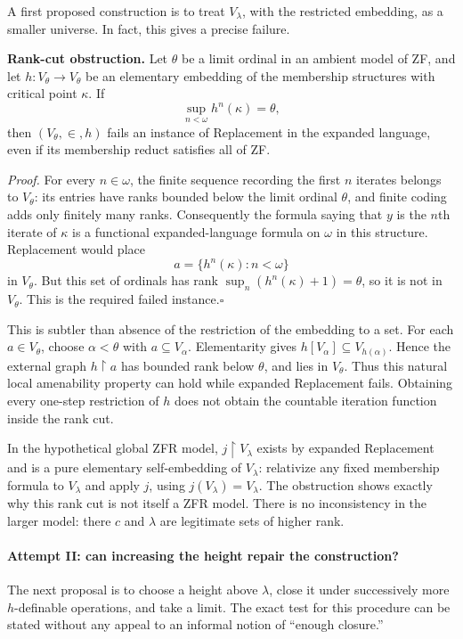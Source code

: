 \documentclass[11pt]{article}
\begin{document}
A first proposed construction is to treat $V_\lambda$, with the restricted
embedding, as a smaller universe.  In fact, this gives a precise failure.

\textbf{Rank-cut obstruction.}
Let $\theta$ be a limit ordinal in an ambient model of ZF, and let
$h:V_\theta\to V_\theta$ be an elementary embedding of the membership
structures with critical point $\kappa$.  If
\[
 \sup_{n<\omega}h^n(\kappa)=\theta,
\]
then $(V_\theta,\in,h)$ fails an instance of Replacement in the expanded
language, even if its membership reduct satisfies all of ZF.

\emph{Proof.}
For every $n\in\omega$, the finite sequence recording the first $n$ iterates
belongs to $V_\theta$: its entries have ranks bounded below the limit ordinal
$\theta$, and finite coding adds only finitely many ranks.  Consequently the
formula saying that $y$ is the $n$th iterate of $\kappa$ is a functional
expanded-language formula on $\omega$ in this structure.  Replacement would
place
\[
 a=\{h^n(\kappa):n<\omega\}
\]
in $V_\theta$.  But this set of ordinals has rank
$\sup_n(h^n(\kappa)+1)=\theta$, so it is not in $V_\theta$.  This is the
required failed instance.\hfill$\square$

This is subtler than absence of the restriction of the embedding to a set.
For each $a\in V_\theta$, choose $\alpha<\theta$ with $a\subseteq V_\alpha$.
Elementarity gives $h[V_\alpha]\subseteq V_{h(\alpha)}$.  Hence the external
graph $h\!\upharpoonright\!a$ has bounded rank below $\theta$, and lies in
$V_\theta$.  Thus this natural local amenability property can hold while
expanded Replacement fails.  Obtaining every one-step restriction of $h$
does not obtain the countable iteration function inside the rank cut.

In the hypothetical global ZFR model, $j\!\upharpoonright\!V_\lambda$ exists
by expanded Replacement and is a pure elementary self-embedding of
$V_\lambda$: relativize any fixed membership formula to $V_\lambda$ and
apply $j$, using $j(V_\lambda)=V_\lambda$.  The obstruction shows exactly why
this rank cut is not itself a ZFR model.  There is no inconsistency in the
larger model: there $c$ and $\lambda$ are legitimate sets of higher rank.

\paragraph{Attempt II: can increasing the height repair the construction?}
The next proposal is to choose a height above $\lambda$, close it under
successively more $h$-definable operations, and take a limit.  The exact test
for this procedure can be stated without any appeal to an informal notion
of ``enough closure.''
\end{document}
